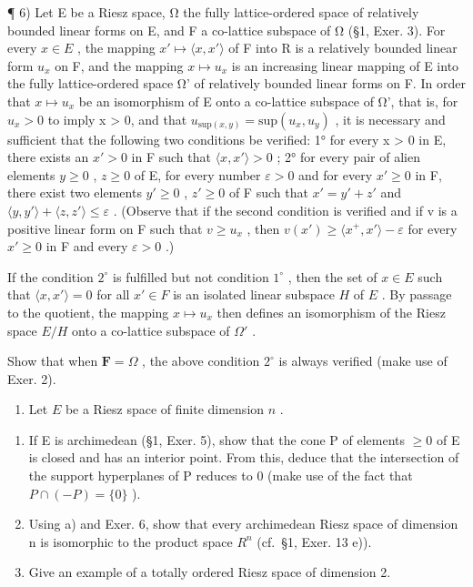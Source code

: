 ¶ 6) Let E be a Riesz space, Ω the fully lattice-ordered space of relatively bounded linear forms on E, and F a co-lattice subspace of Ω (§1, Exer. 3). For every \(x \in E\) , the mapping \(x' \mapsto \langle x, x' \rangle\) of F into R is a relatively bounded linear form \(u_x\) on F, and the mapping \(x \mapsto u_x\) is an increasing linear mapping of E into the fully lattice-ordered space Ω' of relatively bounded linear forms on F. In order that \(x \mapsto u_x\) be an isomorphism of E onto a co-lattice subspace of Ω', that is, for \(u_x > 0\) to imply x \textgreater{} 0, and that \(u_{\text{sup}(x,y)} = \text{sup}(u_x, u_y)\) , it is necessary and sufficient that the following two conditions be verified: 1° for every x \textgreater{} 0 in E, there exists an \(x' > 0\) in F such that \(\langle x, x' \rangle > 0\) ; 2° for every pair of alien elements \(y \geqslant 0\) , \(z \geqslant 0\) of E, for every number \(\varepsilon > 0\) and for every \(x' \geqslant 0\) in F, there exist two elements \(y' \geqslant 0\) , \(z' \geqslant 0\) of F such that \(x' = y' + z'\) and \(\langle y, y' \rangle + \langle z, z' \rangle \leqslant \varepsilon\) . (Observe that if the second condition is verified and if v is a positive linear form on F such that \(v \geqslant u_x\) , then \(v(x') \geqslant \langle x^+, x' \rangle - \varepsilon\) for every \(x' \geqslant 0\) in F and every \(\varepsilon > 0\) .)

If the condition \(2^{\circ}\) is fulfilled but not condition \(1^{\circ}\) , then the set of \(x \in E\) such that \(\langle x, x' \rangle = 0\) for all \(x' \in F\) is an isolated linear subspace \(H\) of \(E\) . By passage to the quotient, the mapping \(x \mapsto u_x\) then defines an isomorphism of the Riesz space \(E / H\) onto a co-lattice subspace of \(\Omega'\) .

Show that when \(\mathbf{F} = \Omega\) , the above condition \(2^{\circ}\) is always verified (make use of Exer. 2).

\begin{enumerate}
\def\labelenumi{\arabic{enumi})}
\setcounter{enumi}{6}
\tightlist
\item
  Let \(E\) be a Riesz space of finite dimension \(n\) .
\end{enumerate}

\begin{enumerate}
\def\labelenumi{\alph{enumi})}
\item
  If E is archimedean (§1, Exer. 5), show that the cone P of elements \(\geqslant 0\) of E is closed and has an interior point. From this, deduce that the intersection of the support hyperplanes of P reduces to 0 (make use of the fact that \(P \cap (-P) = \{0\}\) ).
\item
  Using a) and Exer. 6, show that every archimedean Riesz space of dimension n is isomorphic to the product space \(R^{n}\) (cf.~§1, Exer. 13 e)).
\item
  Give an example of a totally ordered Riesz space of dimension 2.
\end{enumerate}

